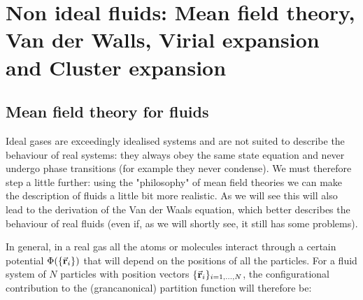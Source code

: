 \documentclass[../main/main.tex]{subfiles}
\begin{document}
\chapter{Non ideal fluids: Mean field theory, Van der Walls, Virial expansion and Cluster expansion}


\section{Mean field theory for fluids}

Ideal gases are exceedingly idealised systems and are not suited to describe the behaviour of real systems: they always obey the same state equation and never undergo phase transitions (for example they never condense). We must therefore step a little further: using the "philosophy" of mean field theories we can make the description of fluids a little bit more realistic. As we will see this will also lead to the derivation of the Van der Waals equation, which better describes the behaviour of real fluids (even if, as we will shortly see, it still has some problems).

In general, in a real gas all the atoms or molecules interact through a certain potential \(\Phi(\{\va{r}_i\})\) that will depend on the positions of all the particles. For a fluid system of  \( N \) particles  with position vectors \( \{ \va{r}_i \}_{i=1,\dots,N}   \), the configurational contribution to the (grancanonical) partition function will therefore be:
\end{document}
